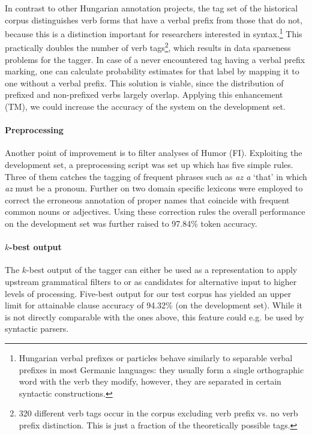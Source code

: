 In contrast to other Hungarian annotation projects, the tag set of the historical corpus distinguishes verb forms that have a verbal prefix from those that do not, because this is a distinction important for researchers interested in syntax.\footnote{Hungarian verbal prefixes or particles behave similarly to separable verbal prefixes in most Germanic languages: they usually form a single orthographic word with the verb they modify, however, they are separated in certain syntactic constructions.} 
This practically doubles the number of verb tags\footnote{320 different verb tags occur in the corpus excluding verb prefix vs. no verb prefix distinction. This is just a fraction of the theoretically possible tags.}, which results in data sparseness problems for the tagger. 
In case of a never encountered tag having a verbal prefix marking, one can calculate probability estimates for that label by mapping it to one without a verbal prefix. 
This solution is viable, since the distribution of prefixed and non-prefixed verbs largely overlap. 
Applying this enhancement (TM), we could increase the accuracy of the system on the development set.

\paragraph{Preprocessing}

Another point of improvement is to filter analyses of Humor (FI). 
Exploiting the development set, a preprocessing script was set up which has five simple rules. 
Three of them catches the tagging of frequent phrases such as \emph{az a} `that' in which \emph{az} must be a pronoun. 
Further on two domain specific lexicons were employed to correct the erroneous annotation of proper names that coincide with frequent common nouns or adjectives. 
Using these correction rules the overall performance on the development set was further raised to 97.84\% token accuracy.



\paragraph{$k$-best output}
The $k$-best output of the tagger can either be used as a representation to apply upstream grammatical filters to or as candidates for alternative input to higher levels of processing. 
Five-best output for our test corpus has yielded an upper limit for attainable clause accuracy of 94.32\% (on the development set). 
While it is not directly comparable with the ones above, this feature could e.g. be used by syntactic parsers.

